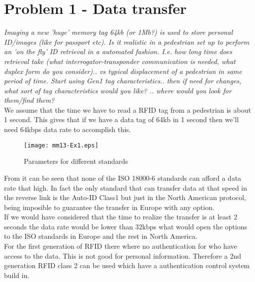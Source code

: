 \section{Problem 1 - Data transfer}
\textit{Imaging a new 'huge' memory tag 64kb (or 1Mb?) is used to store personal ID/images (like for passport etc). Is it realistic in a pedestrian set up to perform an 'on the fly' ID retrieval in a automated fashion. I.e. how long time does retrieval take (what interrogator-transponder communication is needed, what duplex form do you consider).. vs typical displacement of a pedestrian in same period of time. Start using Gen1 tag characteristics.. then if need for changes, what sort of tag characteristics would you like? .. where would you look for them/find them?}\\

We assume that the time we have to read a RFID tag from a pedestrian is about 1 second. This gives that if we have a data tag of 64kb in 1 second then we'll need 64kbps data rate to accomplish this. 

\begin{figure}
\centering
\texttt{[image: mm13-Ex1.eps]}
\caption{Parameters for different standards}\label{fig:data_rates}
\end{figure}

From  it can be seen that none of the ISO 18000-6 standards can afford a data rate that high. In fact the only standard that can transfer data at that speed in the reverse link is the Auto-ID Class1 but just in the North American protocol, being imposible to guarantee the transfer in Europe with any option.\\

If we would have considered that the time to realize the transfer is at least 2 seconds the data rate would be lower than 32kbps what would open the options to the ISO standards in Europe and the rest in North America.\\

For the first generation of RFID there where no authentication for who have access to the data. This is not good for personal information. Therefore a 2nd generation RFID class 2 can be used which have a authentication control system build in. 